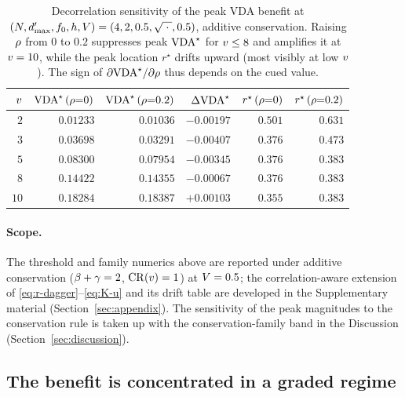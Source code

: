 \begin{table}[t]
  \centering
  \small
  \begin{tabular}{r r r r r r}
    \toprule
    $v$ &
    $\mathrm{VDA}^\star\,(\rho{=}0)$ &
    $\mathrm{VDA}^\star\,(\rho{=}0.2)$ &
    $\Delta \mathrm{VDA}^\star$ &
    $r^\star\,(\rho{=}0)$ &
    $r^\star\,(\rho{=}0.2)$ \\
    \midrule
    $2$  & $0.01233$ & $0.01036$ & $-0.00197$ & $0.501$ & $0.631$ \\
    $3$  & $0.03698$ & $0.03291$ & $-0.00407$ & $0.376$ & $0.473$ \\
    $5$  & $0.08300$ & $0.07954$ & $-0.00345$ & $0.376$ & $0.383$ \\
    $8$  & $0.14422$ & $0.14355$ & $-0.00067$ & $0.376$ & $0.383$ \\
    $10$ & $0.18284$ & $0.18387$ & $\mathbf{+0.00103}$ & $0.355$ & $0.383$ \\
    \bottomrule
  \end{tabular}
  \caption{Decorrelation sensitivity of the peak VDA benefit at
  $(N, d'_{\max}, f_0, h, V) = (4, 2, 0.5, \sqrt{\;\cdot\;}, 0.5)$,
  additive conservation. Raising $\rho$ from $0$ to $0.2$ suppresses
  peak $\mathrm{VDA}^\star$ for $v \le 8$ and amplifies it at $v = 10$,
  while the peak location $r^\star$ drifts upward (most visibly at low
  $v$). The sign of $\partial \mathrm{VDA}^\star / \partial \rho$ thus
  depends on the cued value.}
  \label{tab:rho-sensitivity}
\end{table}

\paragraph{Scope.}
The threshold and family numerics above are reported under additive
conservation ($\beta + \gamma = 2$, $\mathrm{CR}(v) = 1$) at
$V = 0.5$; the correlation-aware extension of
\eqref{eq:r-dagger}--\eqref{eq:K-u} and its drift table are developed in
the Supplementary material (Section~\ref{sec:appendix}). The
sensitivity of the peak magnitudes to the conservation rule is taken up
with the conservation-family band in the Discussion
(Section~\ref{sec:discussion}).

\subsection{The benefit is concentrated in a graded regime}
\label{sec:results-graded}

